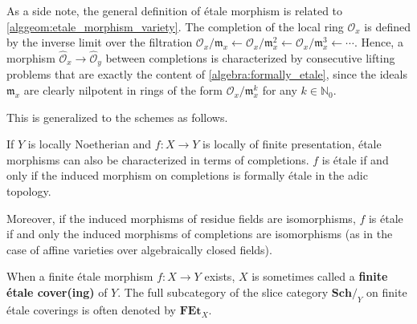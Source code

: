     \begin{remark}
        As a side note, the general definition of \'etale morphism is related to \cref{alggeom:etale_morphism_variety}. The completion of the local ring $\mathcal{O}_x$ is defined by the inverse limit over the filtration $\mathcal{O}_x/\mathfrak{m}_x\leftarrow\mathcal{O}_x/\mathfrak{m}_x^2\leftarrow\mathcal{O}_x/\mathfrak{m}_x^3\leftarrow\cdots$. Hence, a morphism $\widehat{\mathcal{O}}_x\rightarrow\widehat{\mathcal{O}}_y$ between completions is characterized by consecutive lifting problems that are exactly the content of \cref{algebra:formally_etale}, since the ideals $\mathfrak{m}_x$ are clearly nilpotent in rings of the form $\mathcal{O}_x/\mathfrak{m}_x^k$ for any $k\in\mathbb{N}_0$.
    \end{remark}
    This is generalized to the schemes as follows.
    \begin{property}
        If $Y$ is locally Noetherian and $f:X\rightarrow Y$ is locally of finite presentation, \'etale morphisms can also be characterized in terms of completions. $f$ is \'etale if and only if the induced morphism on completions is formally \'etale in the adic topology.

        Moreover, if the induced morphisms of residue fields are isomorphisms, $f$ is \'etale if and only the induced morphisms of completions are isomorphisms (as in the case of affine varieties over algebraically closed fields).
    \end{property}

    \begin{remark}
        When a finite \'etale morphism $f:X\rightarrow Y$ exists, $X$ is sometimes called a \textbf{finite \'etale cover(ing)} of $Y$. The full subcategory of the slice category $\mathbf{Sch}/_Y$ on finite \'etale coverings is often denoted by $\mathbf{FEt}_X$.
    \end{remark}

